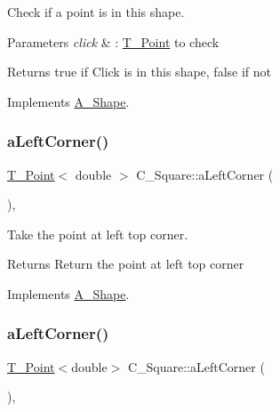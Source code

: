 Check if a point is in this shape. 


\begin{DoxyParams}{Parameters}
{\em click} & \+: \hyperlink{classT__Point}{T\+\_\+\+Point} to check \\
\hline
\end{DoxyParams}
\begin{DoxyReturn}{Returns}
true if Click is in this shape, false if not 
\end{DoxyReturn}


Implements \hyperlink{classA__Shape_a63f825cbc9780208d9a137f5c14917d0}{A\+\_\+\+Shape}.

\mbox{\label{classC__Square_a13e97bb379f1678636e3baf781c2a01b}} 
\subsubsection{\texorpdfstring{a\+Left\+Corner()}{aLeftCorner()}\hspace{0.1cm}{\footnotesize\ttfamily [1/2]}}
{\footnotesize\ttfamily \hyperlink{classT__Point}{T\+\_\+\+Point}$<$ double $>$ C\+\_\+\+Square\+::a\+Left\+Corner (\begin{DoxyParamCaption}{ }\end{DoxyParamCaption})\hspace{0.3cm}{\ttfamily [override]}, {\ttfamily [virtual]}}



Take the point at left top corner. 

\begin{DoxyReturn}{Returns}
Return the point at left top corner 
\end{DoxyReturn}


Implements \hyperlink{classA__Shape_abe6781b13037bf7ecea8ff9456b31533}{A\+\_\+\+Shape}.

\mbox{\label{classC__Square_acc99fea573bbbcc6ab231bc2c6d713f4}} 
\subsubsection{\texorpdfstring{a\+Left\+Corner()}{aLeftCorner()}\hspace{0.1cm}{\footnotesize\ttfamily [2/2]}}
{\footnotesize\ttfamily \hyperlink{classT__Point}{T\+\_\+\+Point}$<$double$>$ C\+\_\+\+Square\+::a\+Left\+Corner (\begin{DoxyParamCaption}{ }\end{DoxyParamCaption})\hspace{0.3cm}{\ttfamily [override]}, {\ttfamily [virtual]}}



